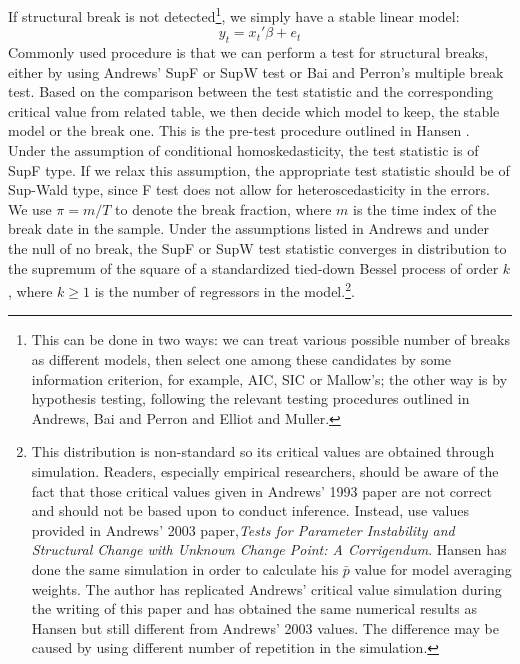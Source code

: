 \documentclass[a4paper,12pt]{article}
\begin{document}
If structural break is not detected\footnote{This can be done in two ways: we can treat various possible number of breaks as different models, then select one among these candidates by some information criterion, for example, AIC, SIC or Mallow's; the other way is by hypothesis testing, following the relevant testing procedures outlined in Andrews\cite{andrews93}, Bai and Perron\cite{bai_perron98} and Elliot and Muller\cite{elliott_muller_RES2006}. }, we simply have a stable linear model:
\begin{equation}
	y_t = x_t'\beta + e_t
\end{equation}
Commonly used procedure is that we can perform a test for structural breaks, either by using Andrews' SupF or SupW test or Bai and Perron's multiple break test. Based on the comparison between the test statistic and the corresponding critical value from related table, we then decide which model to keep, the stable model or the break one. This is the pre-test procedure outlined in Hansen \cite{hansen2009averaging}. Under the assumption of conditional homoskedasticity, the test statistic is of SupF type. If we relax this assumption, the appropriate test statistic should be of Sup-Wald type, since F test does not allow for heteroscedasticity in the errors. We use $\pi = m/T$ to denote the break fraction, where $m$ is the time index of the break date in the sample. Under the assumptions listed in Andrews \cite{andrews93} and under the null of no break, the SupF or SupW test statistic converges in distribution to the supremum of the square of a standardized tied-down Bessel process of order $k$, where $k \geq 1$ is the number of regressors in the model.\footnote{This distribution is non-standard so its critical values are obtained through simulation. Readers, especially empirical researchers, should be aware of the fact that those critical values given in Andrews' 1993 paper are not correct and should not be based upon to conduct inference. Instead, use values provided in Andrews' 2003 paper,\emph{Tests for Parameter Instability and Structural Change with Unknown Change Point: A Corrigendum}. Hansen \cite{hansen2009averaging} has done the same simulation in order to calculate his $\bar{p}$ value for model averaging weights. The author has replicated Andrews' critical value simulation during the writing of this paper and has obtained the same numerical results as Hansen but still different from Andrews' 2003 values. The difference may be caused by using different number of repetition in the simulation.}.
\end{document}
